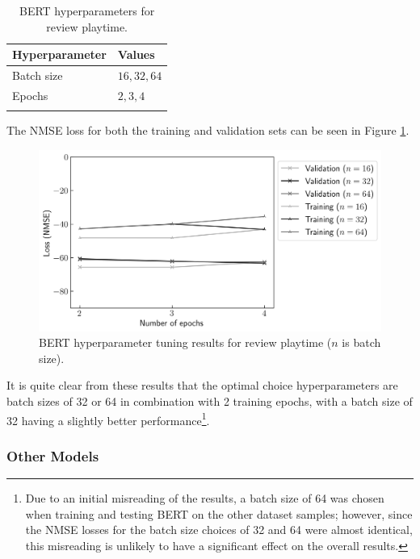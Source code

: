 \begin{table}[ht]
    \centering
    \begin{tabular}{l l}
        \toprule
        \textbf{Hyperparameter} & \textbf{Values}\\\midrule
        Batch size & $16, 32, 64$\\
        Epochs & $2, 3, 4$\\
        \bottomrule\\
    \end{tabular}
    \caption{BERT hyperparameters for review playtime.}
    \label{tab:DI_RF_PT_BERTHP}
\end{table}

The NMSE loss for both the training and validation sets can be seen in Figure \ref{fig:DI_RF_PT_BERTHP}.

\begin{figure}[ht]
    \centering
    \includegraphics[scale=0.7]{figures/05_impl/01_rfp/03_pt/plot_hyperparams_bert.png}
    \caption{BERT hyperparameter tuning results for review playtime ($n$ is batch size).}
    \label{fig:DI_RF_PT_BERTHP}
\end{figure}

It is quite clear from these results that the optimal choice hyperparameters are batch sizes of 32 or 64 in combination with 2 training epochs, with a batch size of 32 having a slightly better performance\footnote{Due to an initial misreading of the results, a batch size of 64 was chosen when training and testing BERT on the other dataset samples; however, since the NMSE losses for the batch size choices of 32 and 64 were almost identical, this misreading is unlikely to have a significant effect on the overall results.}.

\subsubsection{Other Models}

